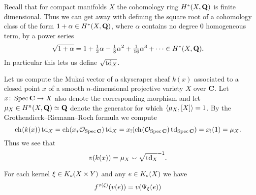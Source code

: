 \begin{remark}
    \label{sqrt of cohomology class}
    Recall that for compact manifolds $X$ the cohomology ring $H^{*}(X, \mathbf Q)$ is finite dimensional. Thus we can get away with defining the square root of a cohomology class of the form $1 + \alpha \in H^{*}(X, \mathbf Q)$, where $\alpha$ contains no degree $0$ homogeneous term, by a power series
    \begin{equation}
        \label{eq: sqrt power series}
        \sqrt{1 + \alpha} = 1 + \tfrac{1}{2}\alpha - \tfrac{1}{8}\alpha^2 + \tfrac{1}{16}\alpha^3 + \cdots \in H^{*}(X, \mathbf Q).
    \end{equation}
    In particular this lets us define $\sqrt{\operatorname{td}_{X}}$.
\end{remark}

\begin{example}
    \label{Mukai vector of skyscraper}
    Let us compute the Mukai vector of a skyscraper sheaf $k(x)$ associated to a closed point $x$ of a smooth $n$-dimensional projective variety $X$ over $\mathbf C$. Let $x \colon \operatorname{Spec}\mathbf C \to X$ also denote the corresponding morphism and let
    $\mu_X \in H^{n}(X, \mathbf Q) \simeq \mathbf Q$ denote the generator for which $\langle \mu_X, [X] \rangle = 1$. By the Grothendieck--Riemann--Roch formula we compute
    \[
        \ch[](k(x))\tdclass{X} = \ch[]{x_*\struct{\spec{\C}}} \tdclass{X} = x_!(\ch[]{\struct{\spec{\C}}}\tdclass{\spec{\C}}) = x_!(1) = \mu_X.
    \]
    Thus we see that
    \[
        v(k(x)) = \mu_X \smallsmile \sqrt{\operatorname{td}_{X}}^{-1}.
    \]
\end{example}

\begin{proposition}
    \label{Mukai vector FM transform interaction}
    \emph{\cite[\S 5.2, Corollary 5.29]{huybrechts2006fouriermukai}}
    For each kernel $\xi \in K_{\circ}(X \times Y)$ and any $e \in K_{\circ}(X)$ we have
    \[
        f^{v(\xi)}(v(e)) = v(\Psi_{\xi}(e))
    \]  
\end{proposition}

